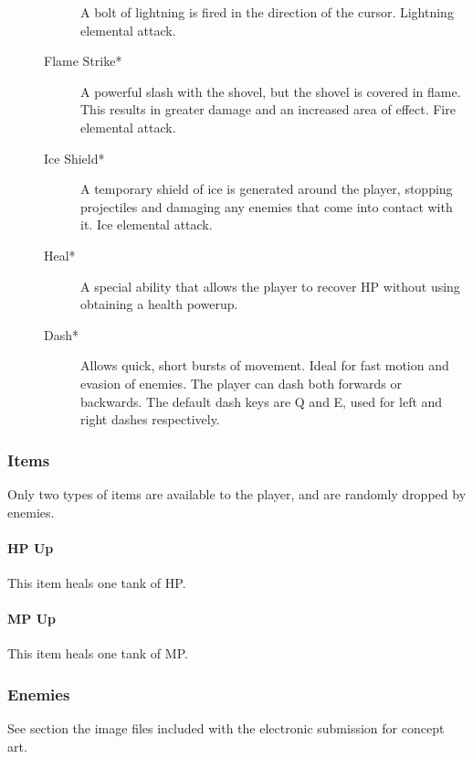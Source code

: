 \documentclass{article}
\begin{document}
\begin{description}
\begin{description}
A bolt of lightning is fired in the direction of the cursor.  Lightning elemental attack.

\item[Flame Strike*]

A powerful slash with the shovel, but the shovel is covered in flame.  This results in greater damage and an increased area of effect.  Fire elemental attack.

\item[Ice Shield*]

A temporary shield of ice is generated around the player, stopping projectiles and damaging any enemies that come into contact with it.  Ice elemental attack.

\item[Heal*]

A special ability that allows the player to recover HP without using obtaining a health powerup.

\item[Dash*]

Allows quick, short bursts of movement.  Ideal for fast motion and evasion of enemies.  The player can dash both forwards or backwards.  The default dash keys are Q and E, used for left and right dashes respectively.

\end{description}

\end{description}

\subsubsection{Items}

Only two types of items are available to the player, and are randomly dropped by enemies.

\paragraph{HP Up}
This item heals one tank of HP.

\paragraph{MP Up}
This item heals one tank of MP.

\subsubsection{Enemies}

See section the image files included with the electronic submission for concept art.
\end{document}
